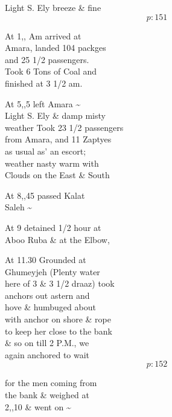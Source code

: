 \documentclass{report}
\begin{document}
	\par{
 	Light S. Ely breeze \& fine\ \\
  \[p: 151 \]

	}


	\par{
 	At 1,, Am arrived at\ \\Amara, landed 104 packges\ \\and 25 1/2 passengers.\ \\Took 6 Tons of Coal and\ \\finished at 3 1/2 am.\ \\
	}

	\par{
 	At 5,,5 left Amara \~{}\ \\Light S. Ely \& damp misty\ \\weather Took 23 1/2 passengers\ \\from Amara, and 11 Zaptyes\ \\as usual as' an escort;\ \\weather nasty warm with\ \\Clouds on the East \& South\ \\
	}

	\par{
 	At 8,,45 passed Kalat\ \\Saleh \~{}\ \\
	}

	\par{
 	At 9 detained 1/2 hour at\ \\Aboo Ruba \& at the Elbow,\ \\
	}

	\par{
 	At 11.30 Grounded at\ \\Ghumeyjeh (Plenty water\ \\here of 3 \& 3 1/2 draaz) took\ \\anchors out astern and\ \\hove \& humbuged about\ \\with anchor on shore \& rope\ \\to keep her close to the bank\ \\\& so on till 2 P.M., we\ \\again anchored to wait\ \\
  \[p: 152 \]

	}

	\par{
 	for the men coming from\ \\the bank \& weighed at\ \\2,,10 \& went on \~{}\ \\
	}
\end{document}

